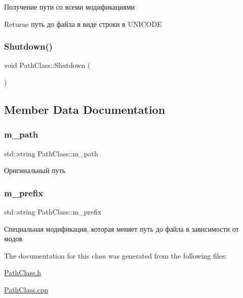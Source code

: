 Получение пути со всеми модификациями 

\begin{DoxyReturn}{Returns}
путь до файла в виде строки в U\+N\+I\+C\+O\+DE 
\end{DoxyReturn}
\mbox{\label{class_path_class_a1ec074523795b82189f6c0ac6e4371f6}} 
\subsubsection{\texorpdfstring{Shutdown()}{Shutdown()}}
{\footnotesize\ttfamily void Path\+Class\+::\+Shutdown (\begin{DoxyParamCaption}{ }\end{DoxyParamCaption})}



\subsection{Member Data Documentation}
\mbox{\label{class_path_class_a538100c80041baadecabc35738609eaf}} 
\subsubsection{\texorpdfstring{m\+\_\+path}{m\_path}}
{\footnotesize\ttfamily std\+::string Path\+Class\+::m\+\_\+path\hspace{0.3cm}{\ttfamily [private]}}



Оригинальный путь 

\mbox{\label{class_path_class_ab43e04cf7461f1d27d27d5733d42351f}} 
\subsubsection{\texorpdfstring{m\+\_\+prefix}{m\_prefix}}
{\footnotesize\ttfamily std\+::string Path\+Class\+::m\+\_\+prefix\hspace{0.3cm}{\ttfamily [private]}}



Специальная модификация, которая меняет путь до файла в зависимости от модов 



The documentation for this class was generated from the following files\+:\begin{DoxyCompactItemize}
\item 
\hyperlink{_path_class_8h}{Path\+Class.\+h}\item 
\hyperlink{_path_class_8cpp}{Path\+Class.\+cpp}\end{DoxyCompactItemize}
